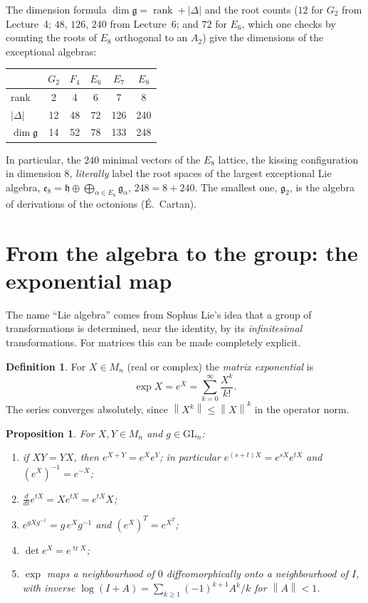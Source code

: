 \documentclass[11pt,openany]{book}
\theoremstyle{plain}
\newtheorem{proposition}[theorem]{Proposition}
\theoremstyle{definition}
\newtheorem{definition}[theorem]{Definition}
\theoremstyle{remark}
\newcommand{\GL}{\mathrm{GL}}
\newcommand{\abs}[1]{\left\lvert #1 \right\rvert}
\newcommand{\norm}[1]{\left\lVert #1 \right\rVert}
\begin{document}
The dimension formula $\dim\mathfrak g=\operatorname{rank}+\abs{\Delta}$ and the root counts ($12$ for
$G_2$ from Lecture~4; $48$, $126$, $240$ from Lecture~6; and $72$ for $E_6$, which one checks by counting
the roots of $E_8$ orthogonal to an $A_2$) give the dimensions of the exceptional algebras:
\begin{center}
\renewcommand{\arraystretch}{1.2}
\begin{tabular}{lccccc}
\toprule
 & $G_2$ & $F_4$ & $E_6$ & $E_7$ & $E_8$\\
\midrule
rank & 2 & 4 & 6 & 7 & 8\\
$\abs{\Delta}$ & 12 & 48 & 72 & 126 & 240\\
$\dim\mathfrak g$ & 14 & 52 & 78 & 133 & 248\\
\bottomrule
\end{tabular}
\end{center}
In particular, the $240$ minimal vectors of the $E_8$ lattice, the kissing configuration in
dimension $8$, \emph{literally} label the root spaces of the largest exceptional Lie algebra,
$\mathfrak e_8=\mathfrak h\oplus\bigoplus_{\alpha\in E_8}\mathfrak g_\alpha$, $248=8+240$. The smallest one,
$\mathfrak g_2$, is the algebra of derivations of the octonions (\'E.~Cartan).

\section{From the algebra to the group: the exponential map}
\label{LIE:sec:exp}

The name ``Lie algebra'' comes from Sophus Lie's idea that a group of transformations is determined,
near the identity, by its \emph{infinitesimal} transformations. For matrices this can be made
completely explicit.

\begin{definition}
For $X\in M_n$ (real or complex) the \emph{matrix exponential} is
\[
  \exp X=e^X=\sum_{k=0}^\infty\frac{X^k}{k!}.
\]
The series converges absolutely, since $\norm{X^k}\le\norm{X}^k$ in the operator norm.
\end{definition}

\begin{proposition}\label{LIE:prop:exp}
For $X,Y\in M_n$ and $g\in\GL_n$:
\begin{enumerate}[nosep]
\item if $XY=YX$, then $e^{X+Y}=e^Xe^Y$; in particular $e^{(s+t)X}=e^{sX}e^{tX}$ and $(e^X)^{-1}=e^{-X}$;
\item $\frac{d}{dt}e^{tX}=Xe^{tX}=e^{tX}X$;
\item $e^{gXg^{-1}}=g\,e^Xg^{-1}$ and $(e^X)^T=e^{X^T}$;
\item $\det e^X=e^{\operatorname{tr}X}$;
\item $\exp$ maps a neighbourhood of $0$ diffeomorphically onto a neighbourhood of $I$, with inverse
  $\log(I+A)=\sum_{k\ge1}(-1)^{k+1}A^k/k$ for $\norm{A}<1$.
\end{enumerate}
\end{proposition}
\end{document}
